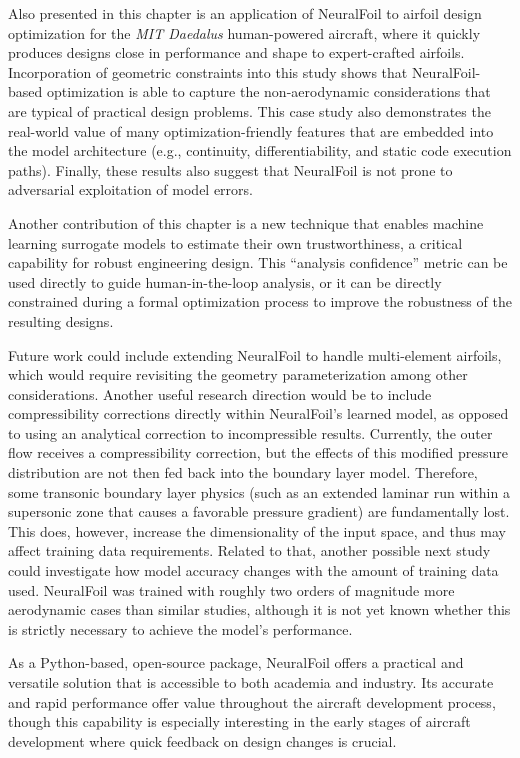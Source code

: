     Also presented in this chapter is an application of NeuralFoil to airfoil design optimization for the \emph{MIT Daedalus} human-powered aircraft, where it quickly produces designs close in performance and shape to expert-crafted airfoils. Incorporation of geometric constraints into this study shows that NeuralFoil-based optimization is able to capture the non-aerodynamic considerations that are typical of practical design problems. This case study also demonstrates the real-world value of many optimization-friendly features that are embedded into the model architecture (e.g., continuity, differentiability, and static code execution paths). Finally, these results also suggest that NeuralFoil is not prone to adversarial exploitation of model errors.

    Another contribution of this chapter is a new technique that enables machine learning surrogate models to estimate their own trustworthiness, a critical capability for robust engineering design. This ``analysis confidence'' metric can be used directly to guide human-in-the-loop analysis, or it can be directly constrained during a formal optimization process to improve the robustness of the resulting designs.

    Future work could include extending NeuralFoil to handle multi-element airfoils, which would require revisiting the geometry parameterization among other considerations. Another useful research direction would be to include compressibility corrections directly within NeuralFoil's learned model, as opposed to using an analytical correction to incompressible results. Currently, the outer flow receives a compressibility correction, but the effects of this modified pressure distribution are not then fed back into the boundary layer model. Therefore, some transonic boundary layer physics (such as an extended laminar run within a supersonic zone that causes a favorable pressure gradient) are fundamentally lost. This does, however, increase the dimensionality of the input space, and thus may affect training data requirements. Related to that, another possible next study could investigate how model accuracy changes with the amount of training data used. NeuralFoil was trained with roughly two orders of magnitude more aerodynamic cases than similar studies, although it is not yet known whether this is strictly necessary to achieve the model's performance.

    As a Python-based, open-source package, NeuralFoil offers a practical and versatile solution that is accessible to both academia and industry. Its accurate and rapid performance offer value throughout the aircraft development process, though this capability is especially interesting in the early stages of aircraft development where quick feedback on design changes is crucial.


